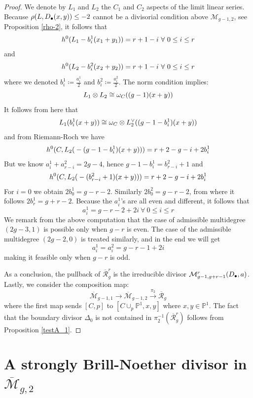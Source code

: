 \documentclass{article}
\theoremstyle{plain}
\theoremstyle{definition}
\def\cM{\mathcal{M}}
\def\rr{\overline{\mathcal{R}}}
\def\mm{\overline{\mathcal{M}}}
\begin{document}
\begin{proof}
	We denote by $L_1$ and $L_2$ the $C_1$ and $C_2$ aspects of the limit linear series. Because $\rho\text{\large(}L, D_\bullet(x,y)\text{\large)} \leq -2$ cannot be a divisorial condition above $\mathcal{M}_{g-1,2}$, see Proposition \ref{rho-2}, it follows that 
	\[ h^0\text{\large(}L_1- b^1_i(x_1+y_1) \text{\large)} = r+1-i \ \forall\ 0 \leq i\leq r \] 
	and
		\[ h^0\text{\large(}L_2- b^2_i(x_2+y_2) \text{\large)} = r+1-i \ \forall \ 0\leq i\leq r \] 
   where we denoted $b^1_i \coloneqq \frac{a^1_i}{2}$ and $b^2_i \coloneqq \frac{a^2_i}{2}$. The norm condition implies: 
   \[ L_1\otimes L_2 \cong \omega_C\text{\large(}(g-1)(x+y) \text{\large )} \]
   It follows from here that 
   \[ L_1\text{\large(}b^1_i(x+y)\text{\large)} \cong \omega_C\otimes L_2^\vee\text{\large (}(g-1-b^1_i)(x+y) \text{\large )} \]
   and from Riemann-Roch we have 
   \[ h^0\text{\Large(}C, L_2\text{\large(}-(g-1-b^1_i)(x+y)\text{\large)}\text{\Large)} = r+2-g-i+2b^1_i \]
   But we know $a^1_i + a^2_{r-i} = 2g-4$, hence $g-1-b^1_i = b^2_{r-i} + 1$ and 
   \[ h^0\text{\Large(}C, L_2\text{\large(}-(b^2_{r-i}+1)(x+y)\text{\large)}\text{\Large)} = r+2-g-i+2b^1_i \]
   For $i = 0$ we obtain $2b^1_0 = g-r-2$. Similarly $2b_0^2 = g-r-2$, from where it follows $2b^1_r = g+r-2$. Because the $a^1_i$'s are all even and different, it follows that 
   \[ a^1_i = g-r-2+2i \ \forall \ 0\leq i \leq r \]
   We remark from the above computation that the case of admissible multidegree $(2g-3,1)$ is possible only when $g-r$ is even. The case of the admissible multidegree $(2g-2,0)$ is treated similarly, and in the end we will get 
   \[ a^1_i = a^2_i = g-r-1 + 2i \]
   making it feasible only when $g-r$ is odd. 
   
   As a conclusion, the pullback of $\rr^r_g$ is the irreducible divisor $\cM^r_{g-1, g+r-1}\text{\large (}D_{\bullet}, \textbf{a}\text{\large )}$. Lastly, we consider the composition map: 
   \[ \mm_{g-1,1} \rightarrow \mm_{g-1,2} \xrightarrow{\pi_2} \rr_g \]
   where the first map sends $[C,p]$ to $[C\cup_p \mathbb{P}^1, x,y]$ where $x, y\in \mathbb{P}^1$. The fact that the boundary divisor $\Delta_0$ is not contained in $\pi_2^{-1}(\rr^r_g)$ follows from Proposition \ref{testA_1}.
\end{proof}

\section{A strongly Brill-Noether divisor in $\mm_{g,2}$} \label{stronglysection}
\end{document}
